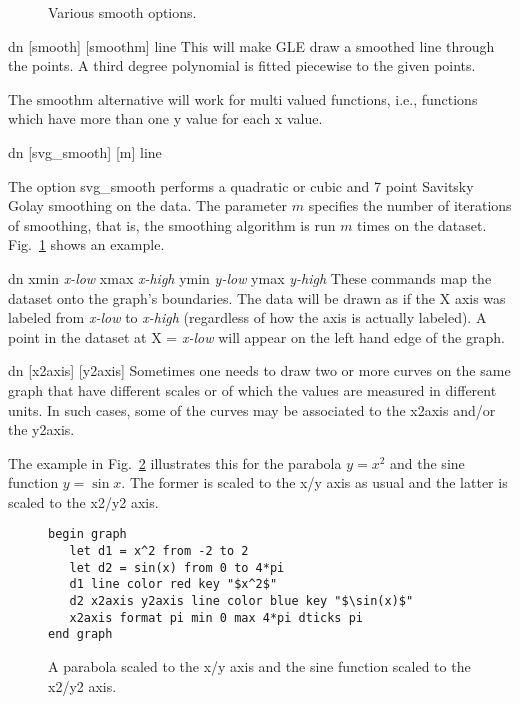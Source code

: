 \begin{commanddescription}
\begin{figure}[tb]
\centering

\caption{\label{smooth:fig}Various smooth options.}
\end{figure}

\item[{\sf dn [smooth] [smoothm] line}]
  
This will make GLE draw a smoothed line through the points.
A third degree polynomial is fitted piecewise to the given points.

The {\sf smoothm} alternative will work for multi valued functions,
i.e., functions which have more than one y value for each x value.

\item[{\sf dn [svg\_smooth] [m] line}]

The option {\sf svg\_smooth} performs a quadratic or cubic and 7 point Savitsky Golay smoothing on the data. The parameter $m$ specifies the number of iterations of smoothing, that is, the smoothing algorithm is run $m$ times on the dataset. Fig.~\ref{smooth:fig} shows an example.

\item[{\sf dn xmin {\it x-low} xmax {\it x-high} ymin {\it y-low} ymax {\it y-high}}  ]
   
These commands map the dataset onto the graph's boundaries.
The data will be drawn as if the X axis was labeled from {\it x-low} to {\it
x-high} (regardless of how the axis is actually labeled).  A point in the
dataset at X = {\it x-low} will appear on the left hand edge of the graph.

\item[{\sf dn [x2axis] [y2axis]}]
 
Sometimes one needs to draw two or more curves on the same graph that have different scales or of which the values are measured in different units. In such cases, some of the curves may be associated to the x2axis and/or the y2axis.

The example in Fig.~\ref{fig:y2scale} illustrates this for the parabola $y = x^2$ and the sine function $y = \sin{x}$. The former is scaled to the x/y axis as usual and the latter is scaled to the x2/y2 axis.

\begin{figure}[tb]
\begin{minipage}[c]{9.2cm}
\begin{Verbatim}
begin graph
   let d1 = x^2 from -2 to 2
   let d2 = sin(x) from 0 to 4*pi
   d1 line color red key "$x^2$"
   d2 x2axis y2axis line color blue key "$\sin(x)$"
   x2axis format pi min 0 max 4*pi dticks pi
end graph
\end{Verbatim}
\end{minipage}
\hfill
\begin{minipage}[c]{7cm}
\mbox{}
\end{minipage}
\caption{\label{fig:y2scale}A parabola scaled to the x/y axis and the sine function scaled to the x2/y2 axis.}
\end{figure}


\end{commanddescription}
